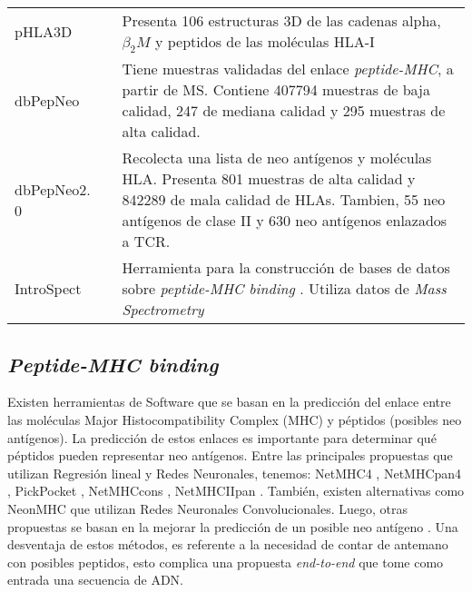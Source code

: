 \begin{table}[H]
\begin{tabular}{lp{3cm}p{8cm}}
		pHLA3D          & \cite{e2019phla3d}                                              & Presenta 106 estructuras 3D de las cadenas alpha, $\beta_2M$ y peptidos de las moléculas HLA-I                                                                                                               \\
		dbPepNeo        & \cite{tan2020dbpepneo}                                          & Tiene muestras validadas del enlace \textit{peptide-MHC}, a partir de MS. Contiene 407794 muestras de baja calidad, 247 de mediana calidad y 295 muestras de alta calidad.                                         \\
		dbPepNeo2. 0    & \cite{lu2022dbpepneo2}                                          & Recolecta una lista de neo antígenos y moléculas HLA. Presenta 801 muestras de alta calidad y 842289  de mala calidad de HLAs. Tambien, 55 neo antígenos de clase II y 630 neo antígenos enlazados a TCR. \\
		IntroSpect      & \cite{zhang2022introspect}                                      & Herramienta para la construcción de bases de datos sobre \textit{peptide-MHC binding} . Utiliza datos de \textit{Mass Spectrometry}                                                                                         
	\end{tabular}
\end{table}


\subsection{\textit{Peptide-MHC binding}}

Existen herramientas de Software que se basan en la predicción del enlace entre las moléculas Major Histocompatibility Complex (MHC) y péptidos (posibles neo antígenos). La predicción de estos enlaces es importante para determinar qué péptidos pueden representar neo antígenos. Entre las principales propuestas que utilizan Regresión lineal y Redes Neuronales, tenemos: NetMHC4 \citep{stevanovic2017landscape}, NetMHCpan4 \citep{robbins2013mining}, PickPocket \citep{tran2014cancer}, NetMHCcons \citep{castle2012exploiting}, NetMHCIIpan \citep{yadav2014predicting}. También, existen alternativas como NeonMHC \citep{van2013tumor} que utilizan Redes Neuronales Convolucionales. Luego, otras propuestas se basan en la mejorar la predicción de un posible neo antígeno \citep{lu2021deep, hao2021improvement, lang2021neofox, chen2021identification, yang2021deepnetbim, li2021deepimmuno}.  Una desventaja de estos métodos, es referente a la necesidad de contar de antemano con posibles peptidos, esto complica una propuesta \textit{end-to-end} que tome como entrada una secuencia de ADN.\\




